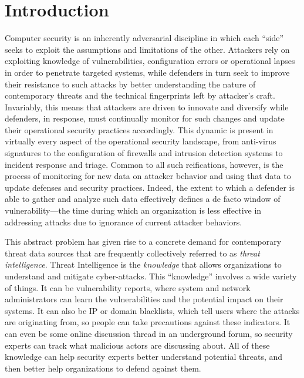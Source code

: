 \chapter{Introduction}

Computer security is an inherently adversarial discipline in which
each ``side'' seeks to exploit the assumptions and limitations of the
other.  Attackers rely on exploiting knowledge of vulnerabilities,
configuration errors or operational lapses in order to penetrate
targeted systems, while defenders in turn seek to improve their
resistance to such attacks by better understanding the nature of
contemporary threats and the technical fingerprints left by attacker's
craft.  Invariably, this means that attackers are driven to innovate
and diversify while defenders, in response, must continually monitor
for such changes and update their operational security practices
accordingly.  This dynamic is present in virtually every aspect of the
operational security landscape, from anti-virus signatures to the
configuration of firewalls and intrusion detection systems to incident
response and triage.  Common to all such reifications, however, is the
process of monitoring for new data on attacker behavior and using that
data to update defenses and security practices. Indeed, the extent to
which a defender is able to gather and analyze such data effectively
defines a de facto window of vulnerability---the time during which an
organization is less effective in addressing attacks due to ignorance
of current attacker behaviors.

This abstract problem has given rise to a concrete demand for
contemporary threat data sources that are frequently collectively
referred to as \emph{threat intelligence}. Threat Intelligence 
is the \emph{knowledge} that allows organizations to understand and 
mitigate cyber-attacks. This ``knowledge'' involves a wide variety 
of things. It can be vulnerability reports, where system and 
network administrators can learn the vulnerabilities and the potential
impact on their systems. It can also be IP or domain blacklists,
which tell users where the attacks are originating from, so people
can take precautions against these indicators. It can even be some 
online discussion thread in an underground forum, so security 
experts can track what malicious actors are discussing about. 
All of these knowledge can help security experts better understand 
potential threats, and then better help organizations to defend 
against them.

